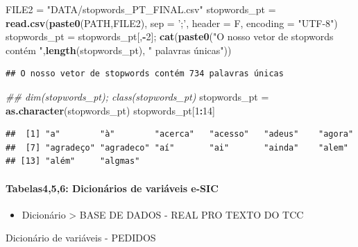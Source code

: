 \documentclass[]{article}
\newenvironment{Shaded}{\begin{snugshade}}{\end{snugshade}}
\newcommand{\CommentTok}[1]{\textcolor[rgb]{0.56,0.35,0.01}{\textit{#1}}}
\newcommand{\DataTypeTok}[1]{\textcolor[rgb]{0.13,0.29,0.53}{#1}}
\newcommand{\DecValTok}[1]{\textcolor[rgb]{0.00,0.00,0.81}{#1}}
\newcommand{\KeywordTok}[1]{\textcolor[rgb]{0.13,0.29,0.53}{\textbf{#1}}}
\newcommand{\NormalTok}[1]{#1}
\newcommand{\OperatorTok}[1]{\textcolor[rgb]{0.81,0.36,0.00}{\textbf{#1}}}
\newcommand{\StringTok}[1]{\textcolor[rgb]{0.31,0.60,0.02}{#1}}
\providecommand{\tightlist}{%
  \setlength{\itemsep}{0pt}\setlength{\parskip}{0pt}}
\let\oldparagraph\paragraph
\renewcommand{\paragraph}[1]{\oldparagraph{#1}\mbox{}}
\begin{document}
\begin{Shaded}
\begin{Highlighting}[]
\NormalTok{FILE2 =}\StringTok{ "DATA/stopwords_PT_FINAL.csv"}
\NormalTok{stopwords_pt =}\StringTok{ }\KeywordTok{read.csv}\NormalTok{(}\KeywordTok{paste0}\NormalTok{(PATH,FILE2), }\DataTypeTok{sep =} \StringTok{';'}\NormalTok{, }\DataTypeTok{header =}\NormalTok{ F, }\DataTypeTok{encoding =} \StringTok{"UTF-8"}\NormalTok{)}
\NormalTok{stopwords_pt =}\StringTok{ }\NormalTok{stopwords_pt[,}\OperatorTok{-}\DecValTok{2}\NormalTok{]; }
\KeywordTok{cat}\NormalTok{(}\KeywordTok{paste0}\NormalTok{(}\StringTok{"O nosso vetor de stopwords contém "}\NormalTok{,}\KeywordTok{length}\NormalTok{(stopwords_pt), }\StringTok{" palavras únicas"}\NormalTok{))}
\end{Highlighting}
\end{Shaded}

\begin{verbatim}
## O nosso vetor de stopwords contém 734 palavras únicas
\end{verbatim}

\begin{Shaded}
\begin{Highlighting}[]
\CommentTok{## dim(stopwords_pt); class(stopwords_pt)}
\NormalTok{stopwords_pt =}\StringTok{ }\KeywordTok{as.character}\NormalTok{(stopwords_pt)}
\NormalTok{stopwords_pt[}\DecValTok{1}\OperatorTok{:}\DecValTok{14}\NormalTok{]}
\end{Highlighting}
\end{Shaded}

\begin{verbatim}
##  [1] "a"        "à"        "acerca"   "acesso"   "adeus"    "agora"   
##  [7] "agradeço" "agradeco" "aí"       "ai"       "ainda"    "alem"    
## [13] "além"     "algmas"
\end{verbatim}

\hypertarget{tabelas456-dicionarios-de-variaveis-e-sic}{%
\paragraph{Tabelas4,5,6: Dicionários de variáveis
e-SIC}\label{tabelas456-dicionarios-de-variaveis-e-sic}}

\begin{itemize}
\tightlist
\item
  Dicionário \textgreater{} BASE DE DADOS - REAL PRO TEXTO DO TCC
\end{itemize}

Dicionário de variáveis - PEDIDOS
\end{document}
